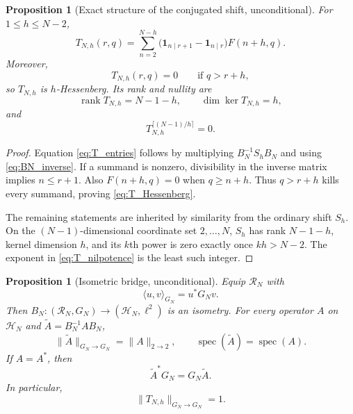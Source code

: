 \documentclass[11pt]{amsart}
\numberwithin{equation}{section}
\theoremstyle{plain}
\newtheorem{proposition}[theorem]{Proposition}
\theoremstyle{definition}
\theoremstyle{remark}
\newcommand{\one}{\mathbf 1}
\newcommand{\Fsurf}{F}
\DeclareMathOperator{\rank}{rank}
\DeclareMathOperator{\spec}{spec}
\begin{document}
\begin{proposition}[Exact structure of the conjugated shift, unconditional]
\label{prop:conjugated_shift}
For $1\le h\le N-2$,
\begin{equation}
T_{N,h}(r,q)
=
\sum_{n=2}^{N-h}
\bigl(\one_{n\mid r+1}-\one_{n\mid r}\bigr)\Fsurf(n+h,q).
\label{eq:T_entries}
\end{equation}
Moreover,
\begin{equation}
T_{N,h}(r,q)=0
\qquad\text{if }q>r+h,
\label{eq:T_Hessenberg}
\end{equation}
so $T_{N,h}$ is $h$-Hessenberg.  Its rank and nullity are
\begin{equation}
\rank T_{N,h}=N-1-h,
\qquad
\dim\ker T_{N,h}=h,
\label{eq:T_rank_kernel}
\end{equation}
and
\begin{equation}
T_{N,h}^{\lceil(N-1)/h\rceil}=0.
\label{eq:T_nilpotence}
\end{equation}
\end{proposition}

\begin{proof}
Equation \eqref{eq:T_entries} follows by multiplying $B_N^{-1}S_hB_N$ and using \eqref{eq:BN_inverse}.  If a summand is nonzero, divisibility in the inverse matrix implies $n\le r+1$.  Also $F(n+h,q)=0$ when $q\ge n+h$.  Thus $q>r+h$ kills every summand, proving \eqref{eq:T_Hessenberg}.

The remaining statements are inherited by similarity from the ordinary shift $S_h$.  On the $(N-1)$-dimensional coordinate set $2,\ldots,N$, $S_h$ has rank $N-1-h$, kernel dimension $h$, and its $k$th power is zero exactly once $kh>N-2$.  The exponent in \eqref{eq:T_nilpotence} is the least such integer.
\end{proof}

\begin{proposition}[Isometric bridge, unconditional]
\label{prop:isometric_bridge}
Equip $\mathcal R_N$ with
\begin{equation}
\langle u,v\rangle_{G_N}=u^*G_Nv.
\label{eq:GN_inner_product}
\end{equation}
Then $B_N:(\mathcal R_N,G_N)\to(\mathcal H_N,\ell^2)$ is an isometry.  For every operator $A$ on $\mathcal H_N$ and $\widetilde A=B_N^{-1}AB_N$,
\begin{equation}
\|\widetilde A\|_{G_N\to G_N}=\|A\|_{2\to2},
\qquad
\spec(\widetilde A)=\spec(A).
\label{eq:isometric_similarity}
\end{equation}
If $A=A^*$, then
\begin{equation}
\widetilde A^*G_N=G_N\widetilde A.
\label{eq:G_selfadjoint}
\end{equation}
In particular,
\begin{equation}
\|T_{N,h}\|_{G_N\to G_N}=1.
\label{eq:T_norm_one}
\end{equation}
\end{proposition}
\end{document}
